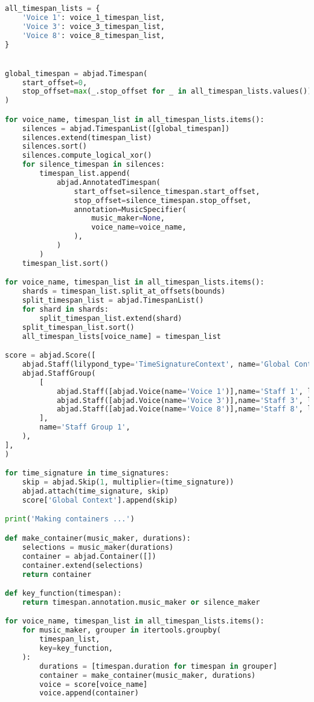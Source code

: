 \begin{lstlisting}[language=Python, caption=Four Ages of Sand Segment\_II]
all_timespan_lists = {
    'Voice 1': voice_1_timespan_list,
    'Voice 3': voice_3_timespan_list,
    'Voice 8': voice_8_timespan_list,
}


global_timespan = abjad.Timespan(
    start_offset=0,
    stop_offset=max(_.stop_offset for _ in all_timespan_lists.values())
)

for voice_name, timespan_list in all_timespan_lists.items():
    silences = abjad.TimespanList([global_timespan])
    silences.extend(timespan_list)
    silences.sort()
    silences.compute_logical_xor()
    for silence_timespan in silences:
        timespan_list.append(
            abjad.AnnotatedTimespan(
                start_offset=silence_timespan.start_offset,
                stop_offset=silence_timespan.stop_offset,
                annotation=MusicSpecifier(
                    music_maker=None,
                    voice_name=voice_name,
                ),
            )
        )
    timespan_list.sort()

for voice_name, timespan_list in all_timespan_lists.items():
    shards = timespan_list.split_at_offsets(bounds)
    split_timespan_list = abjad.TimespanList()
    for shard in shards:
        split_timespan_list.extend(shard)
    split_timespan_list.sort()
    all_timespan_lists[voice_name] = timespan_list

score = abjad.Score([
    abjad.Staff(lilypond_type='TimeSignatureContext', name='Global Context'),
    abjad.StaffGroup(
        [
            abjad.Staff([abjad.Voice(name='Voice 1')],name='Staff 1', lilypond_type='Staff',),
            abjad.Staff([abjad.Voice(name='Voice 3')],name='Staff 3', lilypond_type='Staff',),
            abjad.Staff([abjad.Voice(name='Voice 8')],name='Staff 8', lilypond_type='Staff',),
        ],
        name='Staff Group 1',
    ),
],
)

for time_signature in time_signatures:
    skip = abjad.Skip(1, multiplier=(time_signature))
    abjad.attach(time_signature, skip)
    score['Global Context'].append(skip)

print('Making containers ...')

def make_container(music_maker, durations):
    selections = music_maker(durations)
    container = abjad.Container([])
    container.extend(selections)
    return container

def key_function(timespan):
    return timespan.annotation.music_maker or silence_maker

for voice_name, timespan_list in all_timespan_lists.items():
    for music_maker, grouper in itertools.groupby(
        timespan_list,
        key=key_function,
    ):
        durations = [timespan.duration for timespan in grouper]
        container = make_container(music_maker, durations)
        voice = score[voice_name]
        voice.append(container)


\end{lstlisting}
